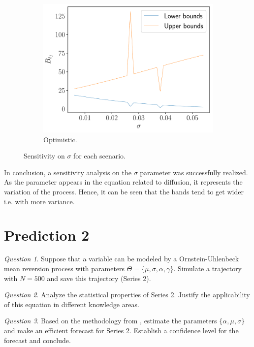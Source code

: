 \documentclass[11pt]{article}
\theoremstyle{definition}
\theoremstyle{remark}
\theoremstyle{remark}
\newtheorem{question}{Question}
\begin{document}
\begin{figure}
\begin{subfigure}[b]{0.45\textwidth}
      \includegraphics[scale=0.45]{sens_optimistic.pdf}
      \caption{Optimistic.}
  \end{subfigure}
  \caption{Sensitivity on $\sigma$ for each scenario.}
  \label{fig:sens1}
\end{figure}

In conclusion, a sensitivity analysis on the $\sigma$ parameter was
successfully realized. As the parameter appears in the equation
related to diffusion, it represents the variation of the
process. Hence, it can be seen that the bands tend to get wider
i.e. with more variance.

\section*{Prediction 2}
\begin{question}
  Suppose that a variable can be modeled by a Ornstein-Uhlenbeck mean
  reversion process with parameters
  $\Theta = \{\mu, \sigma, \alpha, \gamma\}$. Simulate a trajectory
  with $N = 500$ and save this trajectory (Series 2).
\end{question}

\begin{question}
  Analyze the statistical properties of Series 2. Justify the
  applicability of this equation in different knowledge areas.
\end{question}

\begin{question}
  Based on the methodology from \parencite{marin2013}, estimate the
  parameters $\{\alpha, \mu, \sigma\}$ and make an efficient forecast
  for Series 2. Establish a confidence level for the forecast and
  conclude.
\end{question}
\end{document}

